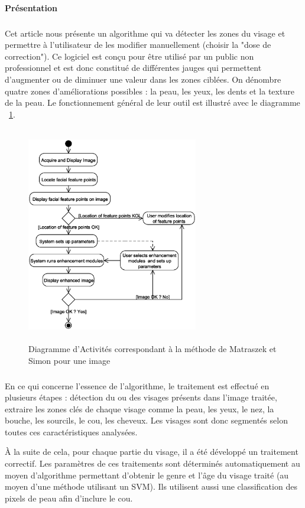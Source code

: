 \documentclass[11pt, french,screen]{report-rd-info}
\begin{document}
\paragraph{Présentation}
\subparagraph{}
Cet article nous présente un algorithme qui va détecter les zones du visage et permettre à l'utilisateur de les modifier manuellement (choisir la "dose de correction"). Ce logiciel est conçu pour être utilisé par un public non professionnel et est donc constitué de différentes jauges qui permettent d'augmenter ou de diminuer une valeur dans les zones ciblées. On dénombre quatre zones d'améliorations possibles : la peau, les yeux, les dents et la texture de la peau. Le fonctionnement général de leur outil est illustré avec le diagramme ~\ref{diag:diagrammebatch}.
\begin{figure}
\centering
\includegraphics[height=9.5cm,width=7.5cm]{Images/ActivityBatch.eps}
\caption{Diagramme d'Activités correspondant à la méthode de Matraszek et Simon \cite{Matraszek2004} pour une image}
\label{diag:diagrammebatch}
\end{figure}

\subparagraph{}
En ce qui concerne l’essence de l’algorithme, le traitement est effectué en plusieurs étapes : détection du ou des visages présents dans l’image traitée, extraire les zones clés de chaque visage comme la peau, les yeux, le nez, la bouche, les sourcils, le cou, les cheveux. Les visages sont donc segmentés selon toutes ces caractéristiques analysées. 

À la suite de cela, pour chaque partie du visage, il a été développé un traitement correctif. Les paramètres de ces traitements sont déterminés automatiquement au moyen d’algorithme permettant d’obtenir le genre et l’âge du visage traité (au moyen d’une méthode utilisant un SVM). Ils utilisent aussi une classification des pixels de peau afin d’inclure le cou.
\end{document}
